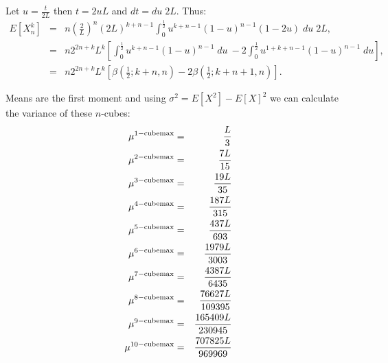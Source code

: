Let $u = \frac{t}{2L}$ then $t = 2uL$ and $dt = du\; 2L$. Thus:
\begin{eqnarray}
E[ X^{k}_{n} ] 
   & = & n\left( \frac{2}{L} \right)^{n} 
          \left( 2L \right)^{k + n -1} 
          \int_0^{\frac{1}{2}} u^{k + n -1} \left( 1 - u \right)^{n-1}
          \left( 1 - 2u \right) \; du \; 2L, \nonumber \\
  & = & n 2^{2n + k} L^{k} \left[ \int_0^{\frac{1}{2}} u^{k + n -1} 
                                \left( 1 - u \right)^{n-1} \; du\  
                              - 2\int_0^{\frac{1}{2}} u^{1+ k + n -1} 
                                 \left( 1 - u \right)^{n-1} \; du
                        \right], \nonumber \\
& = &   n 2^{2n + k} L^{k} \left[ \beta \left(\frac{1}{2}; k + n,  n\right)
                                 - 2\beta\left(\frac{1}{2}; k + n + 1, n\right)\right].  
\end{eqnarray}

Means are the first moment and using $\sigma^2 = E[X^2] - E[X]^2$  we can calculate the  variance of these $n$-cubes:
\begin{eqnarray}
 \mu^{\rm 1-cube max}  & = & \frac{L}{3} \nonumber\\
 \mu^{\rm 2-cube max}  & = & \frac{7L}{15} \nonumber\\
 \mu^{\rm 3-cube max }  & = &  \frac{19 L}{35}\nonumber\\
 \mu^{\rm 4-cube max }  & = & \frac{187 L}{315}\nonumber\\
 \mu^{\rm 5-cube max}  & = &  \frac{437 L}{693}\nonumber\\
 \mu^{\rm 6-cube max}  & = & \frac{1979 L}{3003} \nonumber\\
 \mu^{\rm 7-cube max}  & = &  \frac{4387 L}{6435}\nonumber\\
 \mu^{\rm 8-cube max}  & = & \frac{76627 L}{109395}\nonumber\\
 \mu^{\rm 9-cube max}  & = & \frac{165409 L}{230945}\nonumber\\
 \mu^{\rm 10-cube max} & = & \frac{707825 L}{969969}\nonumber 
\end{eqnarray}

